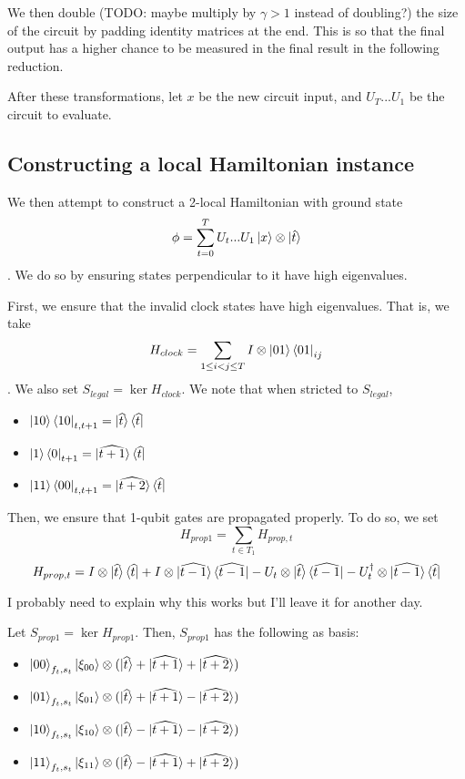 \documentclass{article}
\theoremstyle{definition}
\begin{document}
We then double (TODO: maybe multiply by $\gamma>1$ instead of doubling?) the size of the circuit by padding identity matrices at the end. This is so that the final output has a higher chance to be measured in the final result in the following reduction.

After these transformations, let $x$ be the new circuit input, and $U_T...U_1$ be the circuit to evaluate.

\subsection{Constructing a local Hamiltonian instance}

We then attempt to construct a 2-local Hamiltonian with ground state $$\phi=\sum_{t=0}^TU_t...U_1\ket{x}\otimes\ket{\hat{t}}$$. We do so by ensuring states perpendicular to it have high eigenvalues.

First, we ensure that the invalid clock states have high eigenvalues. That is, we take $$H_{clock}=\sum_{1\leq i<j\leq T} I\otimes \ket{01}\bra{01}_{ij}$$. We also set $S_{legal}=\ker H_{clock}$.
We note that when stricted to $S_{legal}$, 
\begin{itemize}
	\item $\ket{10}\bra{10}_{t,t+1}
		=\ket{\widehat{t}}\bra{\widehat{t}}$ 
	\item $\ket{1}\bra{0}_{t+1}
		=\ket{\widehat{t+1}}\bra{\widehat{t}}$
	\item $\ket{11}\bra{00}_{t,t+1}
		=\ket{\widehat{t+2}}\bra{\widehat{t}}$
\end{itemize}

Then, we ensure that 1-qubit gates are propagated properly. To do so, we set
	$$H_{prop1}=\sum_{t\in T_1}H_{prop,t}$$
	$$H_{prop,t}=I\otimes\ket{\widehat{t}}\bra{\widehat{t}}
		+I\otimes\ket{\widehat{t-1}}\bra{\widehat{t-1}}
		-U_t\otimes\ket{\widehat{t}}\bra{\widehat{t-1}}
		-U_t^\dagger\otimes\ket{\widehat{t-1}}\bra{\widehat{t}}$$

I probably need to explain why this works but I'll leave it for another day.

Let $S_{prop1}=\ker H_{prop1}$.
Then, $S_{prop1}$ has the following as basis:
\begin{itemize}
	\item $\ket{00}_{f_t,s_t}\ket{\xi_{00}}\otimes
		(\ket{\widehat{t}}+\ket{\widehat{t+1}}+\ket{\widehat{t+2}})$
	\item $\ket{01}_{f_t,s_t}\ket{\xi_{01}}\otimes
		(\ket{\widehat{t}}+\ket{\widehat{t+1}}-\ket{\widehat{t+2}})$
	\item $\ket{10}_{f_t,s_t}\ket{\xi_{10}}\otimes
		(\ket{\widehat{t}}-\ket{\widehat{t+1}}-\ket{\widehat{t+2}})$
	\item $\ket{11}_{f_t,s_t}\ket{\xi_{11}}\otimes
		(\ket{\widehat{t}}-\ket{\widehat{t+1}}+\ket{\widehat{t+2}})$
\end{itemize}
\end{document}
